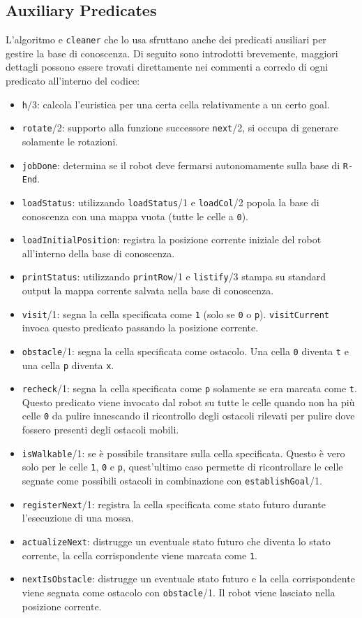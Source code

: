 \subsection{Auxiliary Predicates}
L'algoritmo e \texttt{cleaner} che lo usa sfruttano anche dei predicati ausiliari per gestire la base di conoscenza. Di seguito sono introdotti brevemente, maggiori dettagli possono essere trovati direttamente nei commenti a corredo di ogni predicato all'interno del codice:
\begin{itemize}
	\item \texttt{h}/3: calcola l'euristica per una certa cella relativamente a un certo goal.
	\item \texttt{rotate}/2: supporto alla funzione successore \texttt{next}/2, si occupa di generare solamente le rotazioni.
	\item \texttt{jobDone}: determina se il robot deve fermarsi autonomamente sulla base di \texttt{R-End}.
	\item \texttt{loadStatus}: utilizzando \texttt{loadStatus}/1 e \texttt{loadCol}/2 popola la base di conoscenza con una mappa vuota (tutte le celle a \texttt{0}).
	\item \texttt{loadInitialPosition}: registra la posizione corrente iniziale del robot all'interno della base di conoscenza.
	\item \texttt{printStatus}: utilizzando \texttt{printRow}/1 e \texttt{listify}/3 stampa su standard output la mappa corrente salvata nella base di conoscenza.
	\item \texttt{visit}/1: segna la cella specificata come \texttt{1} (solo se \texttt{0} o \texttt{p}). \texttt{visitCurrent} invoca questo predicato passando la posizione corrente.
	\item \texttt{obstacle}/1: segna la cella specificata come ostacolo. Una cella \texttt{0} diventa \texttt{t} e una cella \texttt{p} diventa \texttt{x}.
	\item \texttt{recheck}/1: segna la cella specificata come \texttt{p} solamente se era marcata come \texttt{t}. Questo predicato viene invocato dal robot su tutte le celle quando non ha più celle \texttt{0} da pulire innescando il ricontrollo degli ostacoli rilevati per pulire dove fossero presenti degli ostacoli mobili.
	\item \texttt{isWalkable}/1: se è possibile transitare sulla cella specificata. Questo è vero solo per le celle \texttt{1}, \texttt{0} e \texttt{p}, quest'ultimo caso permette di ricontrollare le celle segnate come possibili ostacoli in combinazione con \texttt{establishGoal}/1.
	\item \texttt{registerNext}/1: registra la cella specificata come stato futuro durante l'esecuzione di una mossa.
	\item \texttt{actualizeNext}: distrugge un eventuale stato futuro che diventa lo stato corrente, la cella corrispondente viene marcata come \texttt{1}.
	\item \texttt{nextIsObstacle}: distrugge un eventuale stato futuro e la cella corrispondente viene segnata come ostacolo con \texttt{obstacle}/1. Il robot viene lasciato nella posizione corrente.
\end{itemize}


